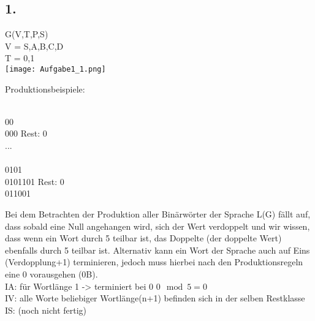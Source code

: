 \documentclass[11pt]{article}
\theoremstyle{definition}
\theoremstyle{remark}
\begin{document}
    \subsection*{1.}
    \begin{normalsize}
        G(V,T,P,S)\\
        V = {S,A,B,C,D}\\
        T = {0,1}\\

        \texttt{[image: Aufgabe1\_1.png]}

        \noindent
        Produktionsbeispiele:\\
        \begin{multicols}{2}

            \\
            00\\
            000 \hspace{15mm} Rest: 0\\
            ... \\

            \\
            0101 \\
            0101101  \hspace{10mm} Rest: 0\\
            011001 \\

        \end{multicols}
        Bei dem Betrachten der Produktion aller Binärwörter der Sprache L(G) fällt auf, dass
        sobald eine Null angehangen wird, sich der Wert verdoppelt und wir wissen, dass wenn ein Wort
        durch 5 teilbar ist, das Doppelte (der doppelte Wert) ebenfalls durch 5 teilbar ist.
        Alternativ kann ein Wort der Sprache auch auf Eins (Verdopplung+1) terminieren, jedoch muss hierbei nach den
        Produktionsregeln eine 0 vorausgehen (0B). \\
        \vspace{10mm}
        IA: für Wortlänge 1 -> terminiert bei 0 \rightarrow \hspace{2mm} $0\mod5=0$\\
        IV: alle Worte beliebiger Wortlänge(n+1) befinden sich in der selben Restklasse\\
        IS: (noch nicht fertig)
    \end{normalsize}
\end{document}
